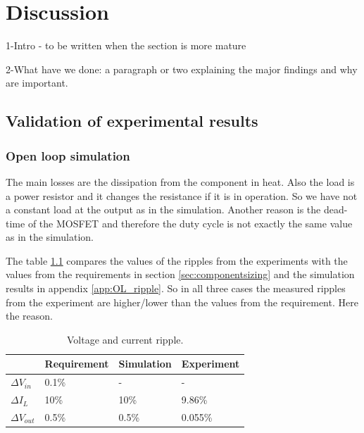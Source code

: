 \chapter{Discussion}


1-Intro - to be written when the section is more mature

2-What have we done:  a paragraph or two explaining the major findings and why are important.

\section{Validation of experimental results}
\subsection{Open loop simulation}
The main losses are the dissipation from the component in heat. Also the load is a power resistor and it changes the resistance if it is in operation. So we have not a constant load at the output as in the simulation. Another reason is the dead-time of the MOSFET and therefore the duty cycle is not exactly the same value as in the simulation. 

The table \ref{tab:ripple} compares the values of the ripples from the experiments with the values from the requirements in section \ref{sec:componentsizing} and the simulation results in appendix \ref{app:OL_ripple}. So in all three cases the measured ripples from the experiment are higher/lower than the values from the requirement. Here the reason.

\begin{table}[H]
	\centering
	\begin{tabular}{|>{\centering}p{3.5cm}|p{3cm}|p{3cm}|p{3cm}|}
		\hline
		\rowcolor{lightgray} \textbf{} & \textbf{Requirement} & \textbf{Simulation}  & \textbf{Experiment}   \tabularnewline \hline
		$\Delta V_{in}$ & 0.1\% & - & - \tabularnewline \hline
		$\Delta I_{L}$ & 10\% & 10\% & 9.86\% \tabularnewline \hline
		$\Delta V_{out}$  & 0.5\% & 0.5\% & 0.055\% \tabularnewline \hline
	\end{tabular}
	\caption{Voltage and current ripple.}
	\label{tab:ripple}
\end{table}



